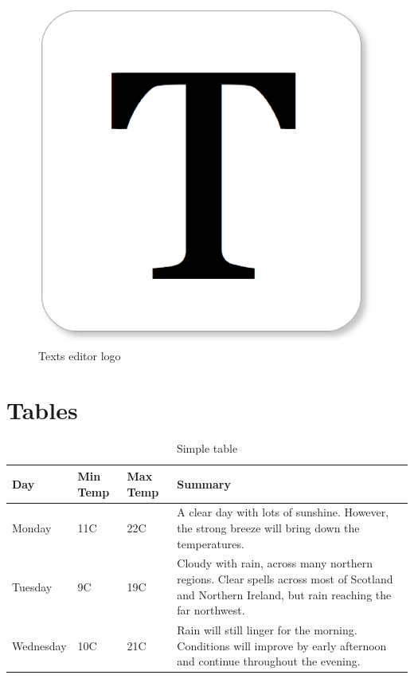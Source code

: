 \documentclass[10pt]{article}
\begin{document}
\begin{figure}[H]
    \centering
    \includegraphics{Texts_Logo.png}
    \caption{Texts editor logo}
    \label{fig:logo}
\end{figure}

\section{Tables}

\begin{table}[H]
\centering
\begin{tabular}{ | l | l | l | p{5cm} |}
\hline
Day & Min Temp & Max Temp & Summary \\ \hline
Monday & 11C & 22C & A clear day with lots of sunshine.  However, the strong breeze will bring down the temperatures. \\ \hline
Tuesday & 9C & 19C & Cloudy with rain, across many northern regions. Clear spells across most of Scotland and Northern Ireland, but rain reaching the far northwest. \\ \hline
Wednesday & 10C & 21C & Rain will still linger for the morning. Conditions will improve by early afternoon and continue throughout the evening. \\
\hline
\end{tabular}
\caption{Simple table}
\label{tab:example}
\end{table}
\end{document}
